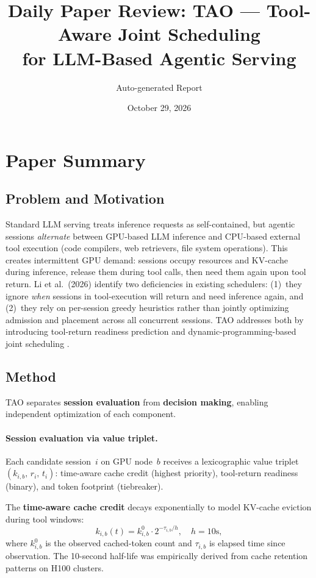\documentclass[11pt,a4paper]{article}
\title{Daily Paper Review: TAO --- Tool-Aware Joint Scheduling\\for LLM-Based Agentic Serving}
\author{Auto-generated Report}
\date{October 29, 2026}
\begin{document}
\maketitle

\section{Paper Summary}

\subsection{Problem and Motivation}
Standard LLM serving treats inference requests as self-contained, but agentic sessions \emph{alternate} between GPU-based LLM inference and CPU-based external tool execution (code compilers, web retrievers, file system operations). This creates intermittent GPU demand: sessions occupy resources and KV-cache during inference, release them during tool calls, then need them again upon tool return. Li et al.\ (2026) identify two deficiencies in existing schedulers: (1)~they ignore \emph{when} sessions in tool-execution will return and need inference again, and (2)~they rely on per-session greedy heuristics rather than jointly optimizing admission and placement across all concurrent sessions. TAO addresses both by introducing tool-return readiness prediction and dynamic-programming-based joint scheduling \cite{li2026tao}.

\subsection{Method}
TAO separates \textbf{session evaluation} from \textbf{decision making}, enabling independent optimization of each component.

\paragraph{Session evaluation via value triplet.} Each candidate session~$i$ on GPU node~$b$ receives a lexicographic value triplet $(k_{i,b},\, r_i,\, t_i)$: time-aware cache credit (highest priority), tool-return readiness (binary), and token footprint (tiebreaker).

The \textbf{time-aware cache credit} decays exponentially to model KV-cache eviction during tool windows:
\begin{equation}
  k_{i,b}(t) = k^0_{i,b} \cdot 2^{-\tau_{i,b}/h}, \quad h = 10\text{s},
\end{equation}
where $k^0_{i,b}$ is the observed cached-token count and $\tau_{i,b}$ is elapsed time since observation. The 10-second half-life was empirically derived from cache retention patterns on H100 clusters.
\end{document}
